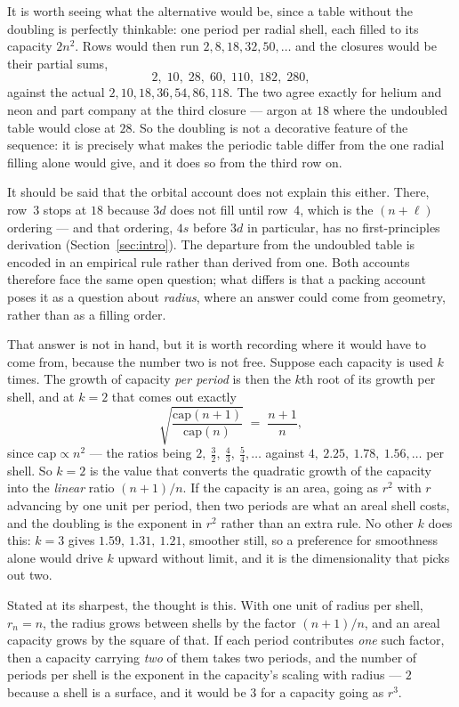 \documentclass[11pt]{article}
\begin{document}
It is worth seeing what the alternative would be, since a table without the doubling is perfectly
thinkable: one period per radial shell, each filled to its capacity $2n^2$. Rows would then run
$2,8,18,32,50,\dots$ and the closures would be their partial sums,
\[
2,\;10,\;28,\;60,\;110,\;182,\;280 ,
\]
against the actual $2,10,18,36,54,86,118$. The two agree exactly for helium and neon and part
company at the third closure --- argon at $18$ where the undoubled table would close at $28$. So the
doubling is not a decorative feature of the sequence: it is precisely what makes the periodic table
differ from the one radial filling alone would give, and it does so from the third row on.

It should be said that the orbital account does not explain this either. There, row~3 stops at $18$
because $3d$ does not fill until row~4, which is the $(n{+}\ell)$ ordering --- and that ordering,
$4s$ before $3d$ in particular, has no first-principles derivation
(Section~\ref{sec:intro}). The departure from the undoubled table is encoded in an empirical rule
rather than derived from one. Both accounts therefore face the same open question; what differs is
that a packing account poses it as a question about \emph{radius}, where an answer could come from
geometry, rather than as a filling order.

That answer is not in hand, but it is worth recording where it would have to come from,
because the number two is not free. Suppose each capacity is used $k$ times. The growth of
capacity \emph{per period} is then the $k$th root of its growth per shell, and at $k=2$ that
comes out exactly
\[
\sqrt{\frac{\mathrm{cap}(n{+}1)}{\mathrm{cap}(n)}} \;=\; \frac{n{+}1}{n},
\]
since $\mathrm{cap}\propto n^2$ --- the ratios being $2,\ \tfrac32,\ \tfrac43,\ \tfrac54,\dots$
against $4,\ 2.25,\ 1.78,\ 1.56,\dots$ per shell. So $k=2$ is the value that converts the
quadratic growth of the capacity into the \emph{linear} ratio $(n{+}1)/n$. If the capacity is an
area, going as $r^2$ with $r$ advancing by one unit per period, then two periods are what an
areal shell costs, and the doubling is the exponent in $r^2$ rather than an extra rule. No other
$k$ does this: $k=3$ gives $1.59,\ 1.31,\ 1.21$, smoother still, so a preference for smoothness
alone would drive $k$ upward without limit, and it is the dimensionality that picks out two.

Stated at its sharpest, the thought is this. With one unit of radius per shell, $r_n=n$, the radius
grows between shells by the factor $(n{+}1)/n$, and an areal capacity grows by the square of that. If
each period contributes \emph{one} such factor, then a capacity carrying \emph{two} of them takes two
periods, and the number of periods per shell is the exponent in the capacity's scaling with radius
--- $2$ because a shell is a surface, and it would be $3$ for a capacity going as $r^3$.
\end{document}
